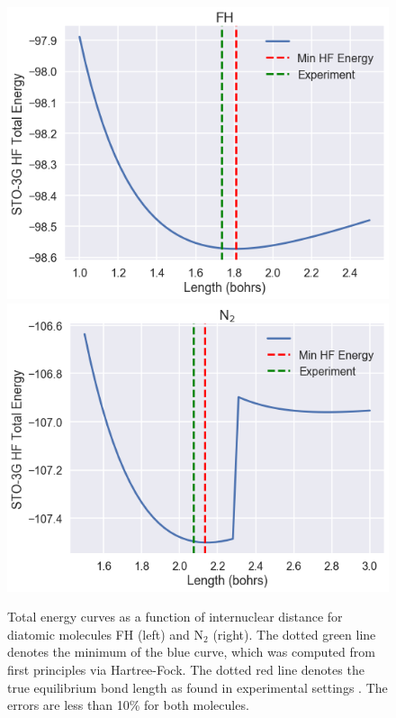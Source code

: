\documentclass[12pt]{article}
\begin{document}
\begin{figure}[h]
\begin{center}
\includegraphics[scale=0.4]{img/bond-len-fh}
\includegraphics[scale=0.4]{img/bond-len-n2}
\end{center}
\caption{Total energy curves as a function of internuclear distance for diatomic molecules FH (left) and N$_2$ (right).  The dotted green line denotes the minimum of the blue curve, which was computed from first principles via Hartree-Fock.  The dotted red line denotes the true equilibrium bond length as found in experimental settings \cite{szabo2012}.  The errors are less than 10\% for both molecules.} \label{bond-len}
\end{figure} 
\end{document}
